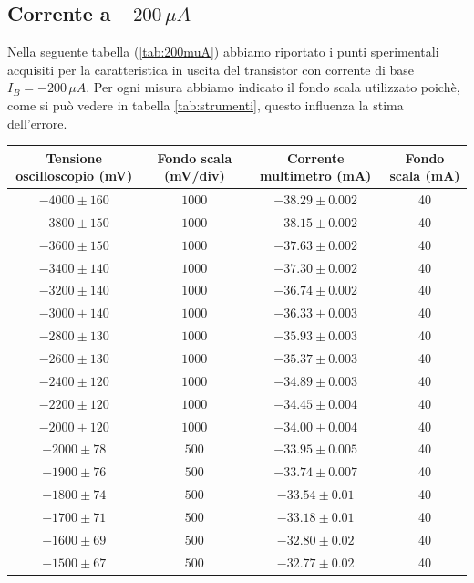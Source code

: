 \documentclass[]{article}
\begin{document}
\subsection{Corrente a $ -200\,\mu A $}
Nella seguente tabella (\ref{tab:200muA}) abbiamo riportato i punti sperimentali acquisiti per la caratteristica in uscita del transistor con corrente di base $ I_{B}= -200\,\mu A $. Per ogni misura abbiamo indicato il fondo scala utilizzato poichè, come si può vedere in tabella \ref{tab:strumenti}, questo influenza la stima dell'errore.
	\begin{table}[H]
		\centering
	\begin{tabular}{|c|c|c|c|}
		\hline
		Tensione oscilloscopio (mV)& Fondo scala (mV/div) & Corrente multimetro (mA) &Fondo scala (mA)\\
		\hline
		$ -4000\pm 160 $ &$ 1000 $ & $ -38.29\pm 0.002 $ &40\\
		\hline
		$-3800\pm150 $ &$ 1000 $ & $ -38.15\pm0.002 $ &40 \\
		\hline
		$ -3600\pm 150 $ &$ 1000 $ & $ -37.63\pm 0.002 $ &40 \\
		\hline
		$ -3400\pm 140 $ &$ 1000 $ & $ -37.30\pm 0.002 $ &40 \\
		\hline
		$ -3200\pm 140 $ &$ 1000 $ & $-36.74\pm 0.002$ &40 \\
		\hline
		$ -3000\pm 140 $ &$ 1000 $ & $ -36.33\pm 0.003 $ &40 \\
		\hline
		$ -2800\pm 130 $ &$ 1000 $ & $ -35.93\pm 0.003 $ &40 \\
		\hline
		$ -2600\pm 130 $ &$ 1000 $ & $ -35.37\pm 0.003 $ &40 \\
		\hline
		$ -2400\pm 120 $ &$ 1000 $ & $ -34.89\pm 0.003 $ &40 \\
		\hline
		$ -2200\pm 120 $ &$ 1000 $ & $ -34.45\pm 0.004 $ &40 \\
		\hline
		$ -2000\pm 120 $ &$ 1000 $ & $ -34.00\pm0.004 $  &40\\
		\hline
		$ -2000\pm 78 $ &$ 500 $ & $ -33.95\pm0.005 $  &40\\
		\hline
		$ -1900\pm 76 $ &$ 500 $ & $ -33.74\pm0.007 $  &40\\
		\hline
		$ -1800\pm 74 $ &$ 500 $ & $ -33.54\pm 0.01 $ &40 \\
		\hline
		$ -1700\pm 71 $ &$ 500 $ & $ -33.18\pm 0.01 $ &40 \\
		\hline
		$ -1600\pm 69 $ &$ 500 $ & $ -32.80\pm 0.02 $ &40 \\
		\hline
		$ -1500\pm 67 $ &$ 500 $ & $ -32.77\pm 0.02 $ &40 \\

\end{tabular}
\end{table}
\end{document}
